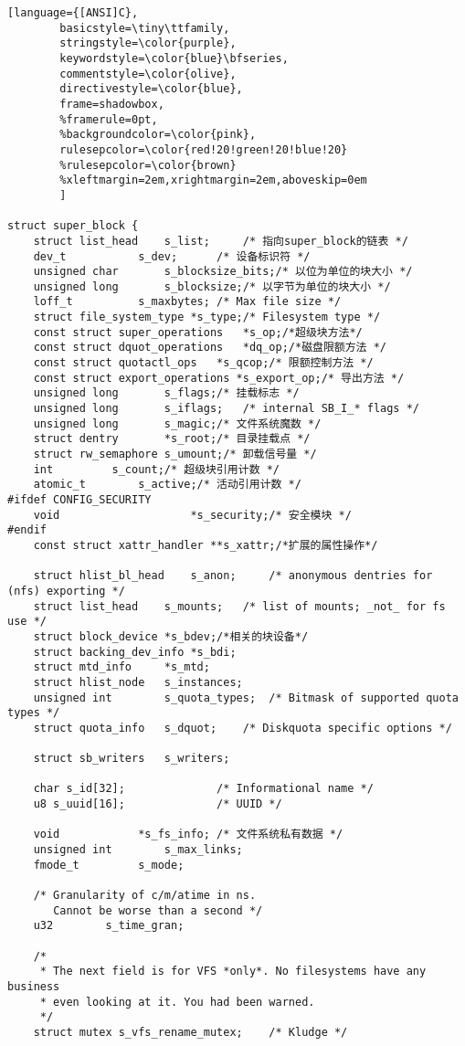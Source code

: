 \begin{lstlisting}[language={[ANSI]C},
        basicstyle=\tiny\ttfamily,
        stringstyle=\color{purple},
        keywordstyle=\color{blue}\bfseries,
        commentstyle=\color{olive},
        directivestyle=\color{blue},
        frame=shadowbox,
        %framerule=0pt,
        %backgroundcolor=\color{pink},
        rulesepcolor=\color{red!20!green!20!blue!20}
        %rulesepcolor=\color{brown}
        %xleftmargin=2em,xrightmargin=2em,aboveskip=0em
        ]
        
struct super_block {
	struct list_head	s_list;		/* 指向super_block的链表 */
	dev_t			s_dev;		/* 设备标识符 */
	unsigned char		s_blocksize_bits;/* 以位为单位的块大小 */
	unsigned long		s_blocksize;/* 以字节为单位的块大小 */
	loff_t			s_maxbytes;	/* Max file size */
	struct file_system_type	*s_type;/* Filesystem type */
	const struct super_operations	*s_op;/*超级块方法*/
	const struct dquot_operations	*dq_op;/*磁盘限额方法 */
	const struct quotactl_ops	*s_qcop;/* 限额控制方法 */
	const struct export_operations *s_export_op;/* 导出方法 */
	unsigned long		s_flags;/* 挂载标志 */
	unsigned long		s_iflags;	/* internal SB_I_* flags */
	unsigned long		s_magic;/* 文件系统魔数 */
	struct dentry		*s_root;/* 目录挂载点 */
	struct rw_semaphore	s_umount;/* 卸载信号量 */
	int			s_count;/* 超级块引用计数 */
	atomic_t		s_active;/* 活动引用计数 */
#ifdef CONFIG_SECURITY
	void                    *s_security;/* 安全模块 */
#endif
	const struct xattr_handler **s_xattr;/*扩展的属性操作*/

	struct hlist_bl_head	s_anon;		/* anonymous dentries for (nfs) exporting */
	struct list_head	s_mounts;	/* list of mounts; _not_ for fs use */
	struct block_device	*s_bdev;/*相关的块设备*/
	struct backing_dev_info *s_bdi;
	struct mtd_info		*s_mtd;
	struct hlist_node	s_instances;
	unsigned int		s_quota_types;	/* Bitmask of supported quota types */
	struct quota_info	s_dquot;	/* Diskquota specific options */

	struct sb_writers	s_writers;

	char s_id[32];				/* Informational name */
	u8 s_uuid[16];				/* UUID */

	void 			*s_fs_info;	/* 文件系统私有数据 */
	unsigned int		s_max_links;
	fmode_t			s_mode;

	/* Granularity of c/m/atime in ns.
	   Cannot be worse than a second */
	u32		   s_time_gran;

	/*
	 * The next field is for VFS *only*. No filesystems have any business
	 * even looking at it. You had been warned.
	 */
	struct mutex s_vfs_rename_mutex;	/* Kludge */


\end{lstlisting}
